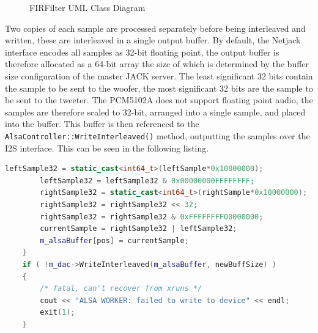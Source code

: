 \documentclass[main.tex]{subfiles}
\begin{document}
\begin{figure}[H]
    \caption{FIRFilter UML Class Diagram}
    \label{fig:alsa-uml}
\end{figure}

\medskip
Two copies of each sample are processed separately before being interleaved and written, these are interleaved in a single output buffer.
By default, the Netjack interface encodes all samples as 32-bit floating point, the output buffer is therefore allocated as a 64-bit array the size of which is determined by the buffer size configuration of the master JACK server.
The least significant 32 bits contain the sample to be sent to the woofer, the most significant 32 bits are the sample to be sent to the tweeter. 
The PCM5102A does not support floating point audio, the samples are therefore scaled to 32-bit, arranged into a single sample, and placed into the buffer. 
This buffer is then referenced to the \lstinline{AlsaController::WriteInterleaved()} method, outputting the samples over the I2S interface.
This can be seen in the following listing.

\begin{lstlisting}[language=c++, caption={Interleaving Tweeter/Woofer Stream}]
        leftSample32 = static_cast<int64_t>(leftSample*0x10000000);
        leftSample32 = leftSample32 & 0x00000000FFFFFFFF;
        rightSample32 = static_cast<int64_t>(rightSample*0x10000000);
        rightSample32 = rightSample32 << 32;
        rightSample32 = rightSample32 & 0xFFFFFFFF00000000; 
        currentSample = rightSample32 | leftSample32;                           
        m_alsaBuffer[pos] = currentSample;
    }
    if ( !m_dac->WriteInterleaved(m_alsaBuffer, newBuffSize) )
    {
        /* fatal, can't recover from xruns */
        cout << "ALSA WORKER: failed to write to device" << endl;
        exit(1);
    }
\end{lstlisting}
\end{document}
